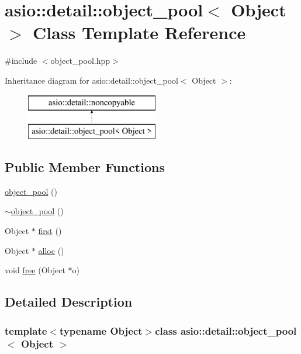 \hypertarget{classasio_1_1detail_1_1object__pool}{}\section{asio\+:\+:detail\+:\+:object\+\_\+pool$<$ Object $>$ Class Template Reference}
\label{classasio_1_1detail_1_1object__pool}


{\ttfamily \#include $<$object\+\_\+pool.\+hpp$>$}

Inheritance diagram for asio\+:\+:detail\+:\+:object\+\_\+pool$<$ Object $>$\+:\begin{figure}[H]
\begin{center}
\leavevmode
\includegraphics[height=2.000000cm]{classasio_1_1detail_1_1object__pool}
\end{center}
\end{figure}
\subsection*{Public Member Functions}
\begin{DoxyCompactItemize}
\item 
\hyperlink{classasio_1_1detail_1_1object__pool_a0014c859482bd18bef8df48f92975603}{object\+\_\+pool} ()
\item 
\hyperlink{classasio_1_1detail_1_1object__pool_a871aeb2e78c8ec2dede4ba8b077174ed}{$\sim$object\+\_\+pool} ()
\item 
Object $\ast$ \hyperlink{classasio_1_1detail_1_1object__pool_a2ee4a226bdb3c4193b6dac5c7c6badbc}{first} ()
\item 
Object $\ast$ \hyperlink{classasio_1_1detail_1_1object__pool_a0cd123c550e8a7a3b624554c581e1f70}{alloc} ()
\item 
void \hyperlink{classasio_1_1detail_1_1object__pool_a9da43a33ccc3024076dd0c5fd662c6a2}{free} (Object $\ast$o)
\end{DoxyCompactItemize}


\subsection{Detailed Description}
\subsubsection*{template$<$typename Object$>$class asio\+::detail\+::object\+\_\+pool$<$ Object $>$}




